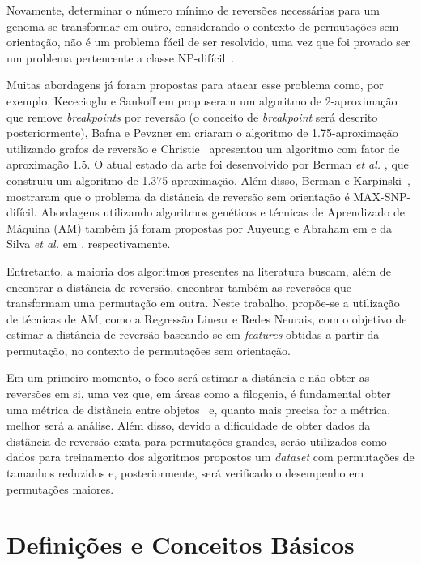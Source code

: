 \documentclass[runningheads,a4paper]{llncs}
\begin{document}
Novamente, determinar o número mínimo de reversões necessárias para um genoma se transformar em outro, considerando o contexto de permutações sem orientação, não é um problema fácil de ser resolvido, uma vez que foi provado ser um problema pertencente a classe NP-difícil~\cite{Caprara}.

Muitas abordagens já foram propostas para atacar esse problema como, por exemplo, Kececioglu e Sankoff em \cite{Kececioglu} propuseram um algoritmo de 2-aproximação que remove \textit{breakpoints} por reversão (o conceito de \textit{breakpoint} será descrito posteriormente), Bafna e Pevzner em \cite{Bafna} criaram o algoritmo de 1.75-aproximação utilizando grafos de reversão e Christie~\cite{Christie} apresentou um algoritmo com fator de aproximação 1.5. O atual estado da arte foi desenvolvido por Berman \textit{et al.} \cite{Berman}, que construiu um algoritmo de 1.375-aproximação. Além disso, Berman e Karpinski~\cite{Berman2}, mostraram que o problema da distância de reversão sem orientação é MAX-SNP-difícil. Abordagens utilizando algoritmos genéticos e técnicas de Aprendizado de Máquina (AM) também já foram propostas por Auyeung e Abraham em \cite{Auyeung} e da Silva \textit{et al.} em \cite{daSilva}, respectivamente.

Entretanto, a maioria dos algoritmos presentes na literatura buscam, além de encontrar a distância de reversão, encontrar também as reversões que transformam uma permutação em outra. Neste trabalho, propõe-se a utilização de técnicas de AM, como a Regressão Linear e Redes Neurais, com o objetivo de estimar a distância de reversão baseando-se em \textit{features} obtidas a partir da permutação, no contexto de permutações sem orientação. 

Em um primeiro momento, o foco será estimar a distância e não obter as reversões em si, uma vez que, em áreas como a filogenia, é fundamental obter uma métrica de distância entre objetos~\cite{Podani} e, quanto mais precisa for a métrica, melhor será a análise. Além disso, devido a dificuldade de obter dados da distância de reversão exata para permutações grandes, serão utilizados como dados para treinamento dos algoritmos propostos um \textit{dataset} com permutações de tamanhos reduzidos e, posteriormente, será verificado o desempenho em permutações maiores.

\section{Definições e Conceitos Básicos}
\label{sec:2}
\end{document}
